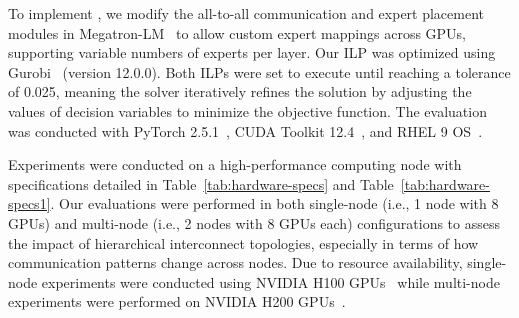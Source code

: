 %
To implement \expertune, we modify the all-to-all communication and expert placement modules in Megatron-LM~\cite{megatron} to allow custom expert mappings across GPUs, supporting variable numbers of experts per layer. Our ILP was optimized using Gurobi~\cite{gurobi} (version 12.0.0). Both ILPs were set to execute until reaching a tolerance of 0.025, meaning the solver iteratively refines the solution by adjusting the values of decision variables to minimize the objective function. The evaluation was conducted with PyTorch 2.5.1~\cite{pytorch}, CUDA Toolkit 12.4~\cite{cuda,nccl}, and RHEL 9 OS~\cite{rhel9}.

\begin{table}
    \centering
    \caption{H100 Server Node Specifications}
    \vspace{-0.7em}
    \label{tab:hardware-specs}
\end{table}


%
Experiments were conducted on a high-performance computing node with specifications detailed in Table~\ref{tab:hardware-specs} and Table~\ref{tab:hardware-specs1}. Our evaluations were performed in both single-node (i.e., 1 node with 8 GPUs) and multi-node (i.e., 2 nodes with 8 GPUs each) configurations to assess the impact of hierarchical interconnect topologies, especially in terms of how communication patterns change across nodes. Due to resource availability, single-node experiments were conducted using NVIDIA H100 GPUs~\cite{h100} while multi-node experiments were performed on NVIDIA H200 GPUs~\cite{h200}.

